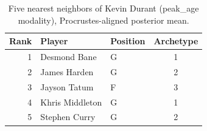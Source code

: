 \begin{table}[htbp]
  \centering\small
  \begin{tabular}{rllc}
    \toprule
    Rank & Player & Position & Archetype \\
    \midrule
    1 & Desmond Bane & G & 1 \\
    2 & James Harden & G & 2 \\
    3 & Jayson Tatum & F & 3 \\
    4 & Khris Middleton & G & 1 \\
    5 & Stephen Curry & G & 2 \\
    \bottomrule
  \end{tabular}
  \caption{Five nearest neighbors of Kevin Durant (peak_age modality), Procrustes-aligned posterior mean.}
  \label{tab:Kevin_Durant_neighbors_peak_age}
\end{table}

